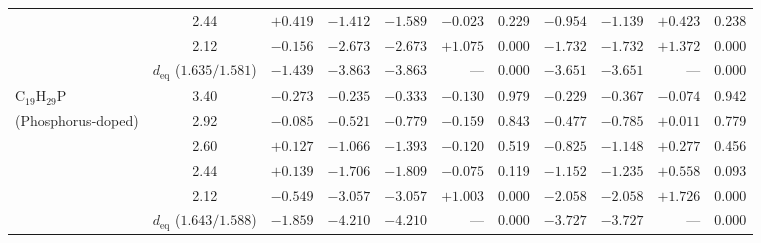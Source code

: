 \documentclass[10pt,twocolumn,a4paper]{article}
\begin{document}
\begin{table}[t]
{\begin{tabular}{@{}lcrrrrrrrrr@{}}
 & 2.44 & $+0.419$ & $-1.412$ & $-1.589$ & $-0.023$ & 0.229 & $-0.954$ & $-1.139$ & $+0.423$ & 0.238 \\
 & 2.12 & $-0.156$ & $-2.673$ & $-2.673$ & $+1.075$ & 0.000 & $-1.732$ & $-1.732$ & $+1.372$ & 0.000 \\
 & $d_{\text{eq}}$ ($1.635 / 1.581$) & $-1.439$ & $-3.863$ & $-3.863$ & --- & 0.000 & $\mathbf{-3.651}$ & $\mathbf{-3.651}$ & --- & 0.000 \\ \midrule
$\text{C}_{19}\text{H}_{29}\text{P}$ & 3.40 & $-0.273$ & $-0.235$ & $-0.333$ & $-0.130$ & 0.979 & $-0.229$ & $-0.367$ & $-0.074$ & 0.942 \\
(Phosphorus-doped) & 2.92 & $-0.085$ & $-0.521$ & $-0.779$ & $-0.159$ & 0.843 & $-0.477$ & $-0.785$ & $+0.011$ & 0.779 \\
 & 2.60 & $+0.127$ & $-1.066$ & $-1.393$ & $-0.120$ & 0.519 & $-0.825$ & $-1.148$ & $+0.277$ & 0.456 \\
 & 2.44 & $+0.139$ & $-1.706$ & $-1.809$ & $-0.075$ & 0.119 & $-1.152$ & $-1.235$ & $+0.558$ & 0.093 \\
 & 2.12 & $-0.549$ & $-3.057$ & $-3.057$ & $+1.003$ & 0.000 & $-2.058$ & $-2.058$ & $+1.726$ & 0.000 \\
 & $d_{\text{eq}}$ ($1.643 / 1.588$) & $-1.859$ & $-4.210$ & $-4.210$ & --- & 0.000 & $\mathbf{-3.727}$ & $\mathbf{-3.727}$ & --- & 0.000 \\ \bottomrule
\end{tabular}%
}
\end{table}
\end{document}
